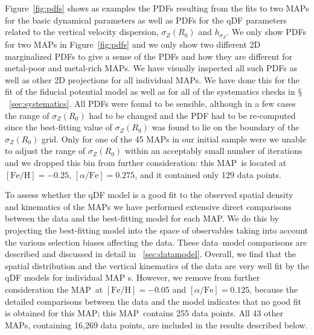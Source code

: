 \documentclass{emulateapj}
\renewcommand{\figurename}{Figure}
\newcommand{\sectionname}{$\mathsection$}
\newcommand{\feh}{\ensuremath{[\mathrm{Fe/H}]}}
\newcommand{\afe}{\ensuremath{[\alpha\mathrm{/Fe}]}}
\newcommand{\map}{MAP}
\begin{document}
\begin{figure}[t!]
\end{figure}

\figurename~\ref{fig:pdfs} shows as examples the PDFs resulting from
the fits to two \map s for the basic dynamical parameters as well as
PDFs for the qDF parameters related to the vertical velocity
dispersion, $\sigma_Z(R_0)$ and $h_{\sigma_Z}$. We only show PDFs for
two \map s in \figurename~\ref{fig:pdfs} and we only show two
different 2D marginalized PDFs to give a sense of the PDFs and how
they are different for metal-poor and metal-rich \map s. We have
visually inspected all such PDFs as well as other 2D projections for
all individual \map s. We have done this for the fit of the fiducial
potential model as well as for all of the systematics checks in
\sectionname~\ref{sec:systematics}. All PDFs were found to be
sensible, although in a few cases the range of $\sigma_Z(R_0)$ had to
be changed and the PDF had to be re-computed since the best-fitting
value of $\sigma_Z(R_0)$ was found to lie on the boundary of the
$\sigma_Z(R_0)$ grid. Only for one of the 45 \map s in our initial
sample were we unable to adjust the range of $\sigma_Z(R_0)$ within an
acceptably small number of iterations and we dropped this bin from
further consideration: this \map\ is located at $\feh = -0.25$, $\afe
= 0.275$, and it contained only 129 data points.

To assess whether the qDF model is a good fit to the observed spatial
density and kinematics of the \map s we have performed extensive
direct comparisons between the data and the best-fitting model for
each \map. We do this by projecting the best-fitting model into the
space of observables taking into account the various selection biases
affecting the data. These data--model comparisons are described and
discussed in detail in \appendixname~\ref{sec:datamodel}. Overall, we
find that the spatial distribution and the vertical kinematics of the
data are very well fit by the qDF models for individual \map
s. However, we remove from further consideration the \map\ at $\feh =
-0.05$ and $\afe = 0.125$, because the detailed comparisons between
the data and the model indicates that no good fit is obtained for this
\map; this \map\ contains 255 data points. All 43 other \map s,
containing 16,269 data points, are included in the results described
below.
\end{document}
